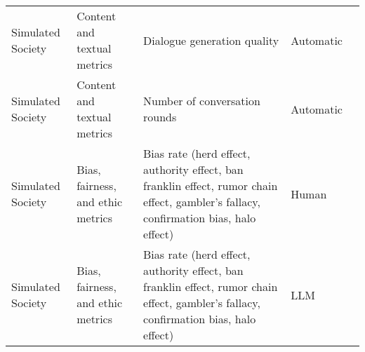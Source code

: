 \begin{small}
\begin{center}
\begin{longtable}{@{}p{}p{}p{}p{}p{}@{}}
Simulated Society        & Content and textual metrics         & Dialogue generation quality                                                                                                                                                                                 & Automatic & \cite{10.1145/3570945.3607303}                                                                                                                                                                                                                                                                                                                                                                              \\
Simulated Society        & Content and textual metrics         & Number of conversation rounds                                                                                                                                                                               & Automatic & \cite{10.1145/3613904.3642545}                                                                                                                                                                                                                                                                                                                                                                          \\
Simulated Society        & Bias, fairness, and ethic metrics   & Bias rate (herd effect, authority effect, ban franklin effect, rumor chain effect, gambler's fallacy, confirmation bias, halo effect)                                                                       & Human     & \cite{liu2025exploringprosocialirrationalityllm}                                                                                                                                                                                                                                                                                                                                                                                            \\
Simulated Society        & Bias, fairness, and ethic metrics   & Bias rate (herd effect, authority effect, ban franklin effect, rumor chain effect, gambler's fallacy, confirmation bias, halo effect)                                                                       & LLM       & \cite{liu2025exploringprosocialirrationalityllm}                                                                                                                                                                                                                                                                                                                                                                                            \\

\end{longtable}
\end{center}
\end{small}
